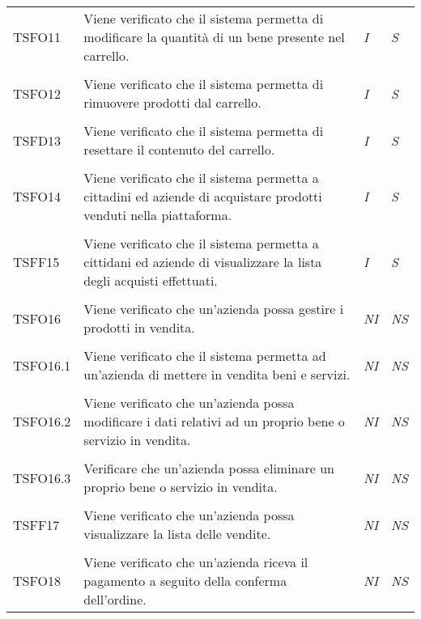 \begin{longtable}{ >{\centering}p{} >{}p{}
			>{\centering}p{} >{\centering}p{}}
		\tabularnewline
		\hypertarget{TSFO11}{TSFO11} & Viene verificato che il sistema permetta di 
		modificare la quantità di un bene presente nel carrello. & 
		\textit{I} & \textit{S}\\ 

		\tabularnewline
		\hypertarget{TSFO12}{TSFO12} & Viene verificato che il sistema permetta di 
		rimuovere prodotti dal carrello. & \textit{I} & \textit{S}\\ 

		\tabularnewline
		\hypertarget{TSFD13}{TSFD13} & Viene verificato che il sistema permetta di 
		resettare il contenuto del carrello. & \textit{I} & \textit{S}\\ 

		\tabularnewline
		\hypertarget{TSFO14}{TSFO14} & Viene verificato che il sistema permetta 
		a 
		cittadini ed aziende di acquistare prodotti venduti nella piattaforma. & 
		\textit{I} & \textit{S}\\ 

		\tabularnewline
		\hypertarget{TSFF15}{TSFF15} & Viene verificato che il sistema permetta a 
		cittidani ed aziende di visualizzare la lista degli acquisti effettuati. & 
		\textit{I} & \textit{S}\\ 

		\tabularnewline
		\hypertarget{TSFO16}{TSFO16} & Viene verificato che un'azienda possa gestire i 
		prodotti in vendita. & \textit{NI} & \textit{NS}\\ 

		\tabularnewline
		\hypertarget{TSFO16.1}{TSFO16.1} & Viene verificato che il sistema permetta ad 
		un'azienda di mettere in vendita beni e servizi. & \textit{NI} & \textit{NS}\\ 

		\tabularnewline
		\hypertarget{TSFO16.2}{TSFO16.2} & Viene verificato che un'azienda possa 
		modificare i dati relativi ad un proprio bene o servizio in vendita. & 
		\textit{NI} & \textit{NS}\\ 

		\tabularnewline
		\hypertarget{TSFO16.3}{TSFO16.3} & Verificare che un'azienda possa eliminare un 
		proprio bene o servizio in vendita. & \textit{NI} & \textit{NS}\\ 

		\tabularnewline
		\hypertarget{TSFF17}{TSFF17} & Viene verificato che un'azienda possa 
		visualizzare la lista delle vendite. & \textit{NI} & \textit{NS}\\ 

		\tabularnewline
		\hypertarget{TSFO18}{TSFO18} & Viene verificato che un'azienda riceva il 
		pagamento a seguito della conferma dell'ordine. & \textit{NI} & \textit{NS}\\ 


\end{longtable}
